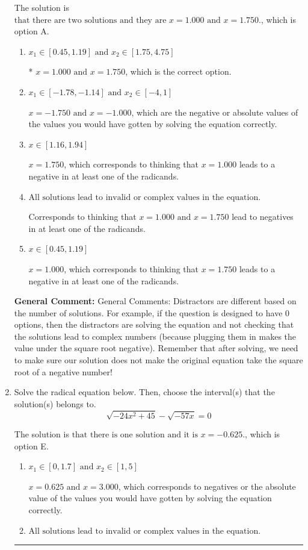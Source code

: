 \documentclass{extbook}[14pt]
\newcommand{\litem}[1]{\item #1

\rule{\textwidth}{0.4pt}}
\begin{document}
\begin{enumerate}
{The solution is \( \text{that there are two solutions and they are } x = 1.000 \text{ and } x = 1.750. \), which is option A.\begin{enumerate}[label=\Alph*.]
\item \( x_1 \in [0.45, 1.19] \text{ and } x_2 \in [1.75,4.75] \)

* $x = 1.000 \text{ and } x = 1.750$, which is the correct option.
\item \( x_1 \in [-1.78, -1.14] \text{ and } x_2 \in [-4,1] \)

$x = -1.750 \text{ and } x = -1.000$, which are the negative or absolute values of the values you would have gotten by solving the equation correctly.
\item \( x \in [1.16,1.94] \)

$x = 1.750$, which corresponds to thinking that $x = 1.000$ leads to a negative in at least one of the radicands.
\item \( \text{All solutions lead to invalid or complex values in the equation.} \)

Corresponds to thinking that $x = 1.000 \text{ and } x = 1.750$ lead to negatives in at least one of the radicands.
\item \( x \in [0.45,1.19] \)

$x = 1.000$, which corresponds to thinking that $x = 1.750$ leads to a negative in at least one of the radicands.
\end{enumerate}

\textbf{General Comment:} General Comments: Distractors are different based on the number of solutions. For example, if the question is designed to have 0 options, then the distractors are solving the equation and not checking that the solutions lead to complex numbers (because plugging them in makes the value under the square root negative). Remember that after solving, we need to make sure our solution does not make the original equation take the square root of a negative number!
}
\litem{
Solve the radical equation below. Then, choose the interval(s) that the solution(s) belongs to.
\[ \sqrt{-24 x^2 + 45} - \sqrt{-57 x} = 0 \]

The solution is \( \text{that there is one solution and it is } x = -0.625. \), which is option E.\begin{enumerate}[label=\Alph*.]
\item \( x_1 \in [0, 1.7] \text{ and } x_2 \in [1,5] \)

$x = 0.625 \text{ and } x = 3.000$, which corresponds to negatives or the absolute value of the values you would have gotten by solving the equation correctly.
\item \( \text{All solutions lead to invalid or complex values in the equation.} \)


\end{enumerate}}
\end{enumerate}
\end{document}

